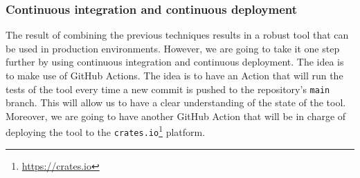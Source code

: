 \subsubsection{Continuous integration and continuous deployment}

The result of combining the previous techniques results in a robust tool that can be used in production environments. However, we are going to take it one step further by using continuous integration and continuous deployment. The idea is to make use of GitHub Actions. The idea is to have an Action that will run the tests of the tool every time a new commit is pushed to the repository's \texttt{main} branch. This will allow us to have a clear understanding of the state of the tool. Moreover, we are going to have another GitHub Action that will be in charge of deploying the tool to the \texttt{crates.io}\footnote{\url{https://crates.io}} platform.